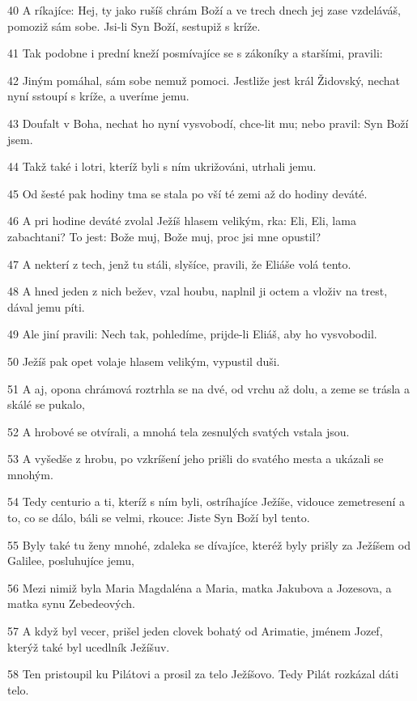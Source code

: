 \par 40 A ríkajíce: Hej, ty jako rušíš chrám Boží a ve trech dnech jej zase vzdeláváš, pomoziž sám sobe. Jsi-li Syn Boží, sestupiž s kríže.
\par 41 Tak podobne i prední kneží posmívajíce se s zákoníky a staršími, pravili:
\par 42 Jiným pomáhal, sám sobe nemuž pomoci. Jestliže jest král Židovský, nechat nyní sstoupí s kríže, a uveríme jemu.
\par 43 Doufalt v Boha, nechat ho nyní vysvobodí, chce-lit mu; nebo pravil: Syn Boží jsem.
\par 44 Takž také i lotri, kteríž byli s ním ukrižováni, utrhali jemu.
\par 45 Od šesté pak hodiny tma se stala po vší té zemi až do hodiny deváté.
\par 46 A pri hodine deváté zvolal Ježíš hlasem velikým, rka: Eli, Eli, lama zabachtani? To jest: Bože muj, Bože muj, proc jsi mne opustil?
\par 47 A nekterí z tech, jenž tu stáli, slyšíce, pravili, že Eliáše volá tento.
\par 48 A hned jeden z nich bežev, vzal houbu, naplnil ji octem a vloživ na trest, dával jemu píti.
\par 49 Ale jiní pravili: Nech tak, pohledíme, prijde-li Eliáš, aby ho vysvobodil.
\par 50 Ježíš pak opet volaje hlasem velikým, vypustil duši.
\par 51 A aj, opona chrámová roztrhla se na dvé, od vrchu až dolu, a zeme se trásla a skálé se pukalo,
\par 52 A hrobové se otvírali, a mnohá tela zesnulých svatých vstala jsou.
\par 53 A vyšedše z hrobu, po vzkríšení jeho prišli do svatého mesta a ukázali se mnohým.
\par 54 Tedy centurio a ti, kteríž s ním byli, ostríhajíce Ježíše, vidouce zemetresení a to, co se dálo, báli se velmi, rkouce: Jiste Syn Boží byl tento.
\par 55 Byly také tu ženy mnohé, zdaleka se dívajíce, kteréž byly prišly za Ježíšem od Galilee, posluhujíce jemu,
\par 56 Mezi nimiž byla Maria Magdaléna a Maria, matka Jakubova a Jozesova, a matka synu Zebedeových.
\par 57 A když byl vecer, prišel jeden clovek bohatý od Arimatie, jménem Jozef, kterýž také byl ucedlník Ježíšuv.
\par 58 Ten pristoupil ku Pilátovi a prosil za telo Ježíšovo. Tedy Pilát rozkázal dáti telo.
